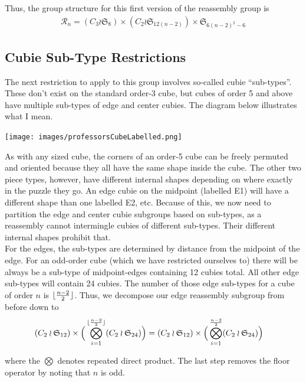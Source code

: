 \documentclass[10pt,letterpaper]{report}
\DeclarePairedDelimiter\floor{\lfloor}{\rfloor}
\begin{document}
Thus, the group structure for this first version of the reassembly group is\begin{align*}
\mathcal{R}_n = (C_3 \wr \mathfrak{S}_8) \times (C_2 \wr \mathfrak{S}_{12(n-2)}) \times \mathfrak{S}_{6(n-2)^2 - 6}
\end{align*}

\subsection{Cubie Sub-Type Restrictions}
The next restriction to apply to this group involves so-called cubie ``sub-types''.  These don't exist on the standard order-3 cube, but cubes of order 5 and above have multiple sub-types of edge and center cubies.  The diagram below illustrates what I mean.

\begin{center}
\texttt{[image: images/professorsCubeLabelled.png]} 
\end{center}

As with any sized cube, the corners of an order-5 cube can be freely permuted and oriented because they all have the same shape inside the cube.  The other two piece types, however, have different internal shapes depending on where exactly in the puzzle they go.  An edge cubie on the midpoint (labelled E1) will have a different shape than one labelled E2, etc.  Because of this, we now need to partition the edge and center cubie subgroups based on sub-types, as a reassembly cannot intermingle cubies of different sub-types.  Their different internal shapes prohibit that. \\

For the edges, the sub-types are determined by distance from the midpoint of the edge.  For an odd-order cube (which we have restricted ourselves to) there will be always be a sub-type of midpoint-edges containing 12 cubies total.  All other edge sub-types will contain 24 cubies.  The number of those edge sub-types for a cube of order $n$ is $\floor{\frac{n-2}{2}}$.  Thus, we decompose our edge reassembly subgroup from before down to \begin{align*}
(C_2 \wr \mathfrak{S}_{12}) \times \Big( \bigotimes_{i=1}^{\floor{\frac{n-2}{2}}} (C_2 \wr \mathfrak{S}_{24}) \Big)
&= (C_2 \wr \mathfrak{S}_{12}) \times \Big( \bigotimes_{i=1}^{\frac{n-3}{2}} (C_2 \wr \mathfrak{S}_{24}) \Big)
\end{align*}

where the $\bigotimes$ denotes repeated direct product.  The last step removes the floor operator by noting that $n$ is odd. \\
\end{document}
